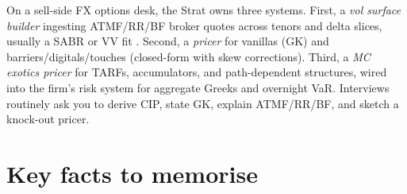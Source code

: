 \begin{gsbox}[title={The FX options desk}]
On a sell-side FX options desk, the Strat owns three systems.
First, a \emph{vol surface builder} ingesting ATMF/RR/BF broker
quotes across tenors and delta slices, usually a SABR or VV fit
\citep{castagna2007consistent}.  Second, a \emph{pricer} for
vanillas (GK) and barriers/digitals/touches (closed-form with
skew corrections).  Third, a \emph{MC exotics pricer} for TARFs,
accumulators, and path-dependent structures, wired into the firm's
risk system for aggregate Greeks and overnight VaR.  Interviews
routinely ask you to derive CIP, state GK, explain ATMF/RR/BF, and
sketch a knock-out pricer.
\end{gsbox}


\section{Key facts to memorise}
\label{sec:fx_summary}

